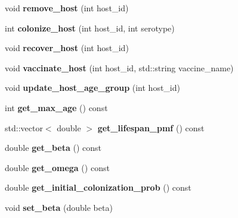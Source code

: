 \begin{DoxyCompactItemize}
\mbox{\label{class_population_ac2b8907a29f8a87429ecb73a47708a64}} 
void {\bfseries remove\+\_\+host} (int host\+\_\+id)
\item 
\mbox{\label{class_population_a14c15a068f30d948181db14b33387f14}} 
int {\bfseries colonize\+\_\+host} (int host\+\_\+id, int serotype)
\item 
\mbox{\label{class_population_a9a55852732be604b635b16d3321153f8}} 
void {\bfseries recover\+\_\+host} (int host\+\_\+id)
\item 
\mbox{\label{class_population_ae07dcab12ee94b00f7366f919365cbfa}} 
void {\bfseries vaccinate\+\_\+host} (int host\+\_\+id, std\+::string vaccine\+\_\+name)
\item 
\mbox{\label{class_population_abaecaa2e94d7869a831872aa143d7018}} 
void {\bfseries update\+\_\+host\+\_\+age\+\_\+group} (int host\+\_\+id)
\item 
\mbox{\label{class_population_af8f81bd8da9c4c2bb1027328b6197a47}} 
int {\bfseries get\+\_\+max\+\_\+age} () const
\item 
\mbox{\label{class_population_a231245721d8634e1717fb45893243aac}} 
std\+::vector$<$ double $>$ {\bfseries get\+\_\+lifespan\+\_\+pmf} () const
\item 
\mbox{\label{class_population_a2c3e7a74d5f2e2bc32b82f5be5cee8d3}} 
double {\bfseries get\+\_\+beta} () const
\item 
\mbox{\label{class_population_aad0f4342c423e314830a01465ff9e0a4}} 
double {\bfseries get\+\_\+omega} () const
\item 
\mbox{\label{class_population_ad7e9d661c3f896fdfb9ed5ac43325e17}} 
double {\bfseries get\+\_\+initial\+\_\+colonization\+\_\+prob} () const
\item 
\mbox{\label{class_population_a7e1d302dfed06509d6c65ee8d646fc20}} 
void {\bfseries set\+\_\+beta} (double beta)
\end{DoxyCompactItemize}
